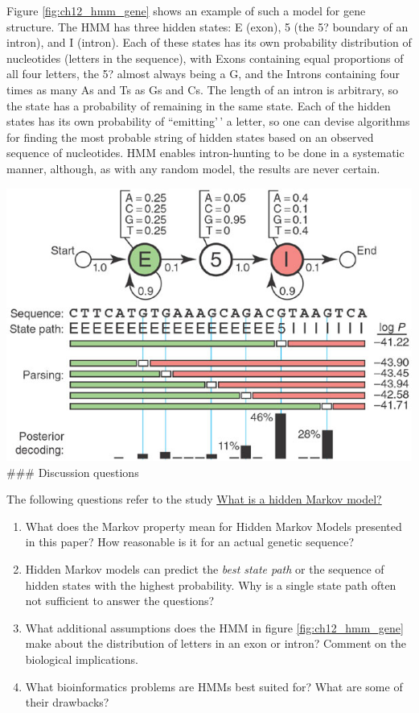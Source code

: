 \documentclass[
  letterpaper,
  DIV=11,
  numbers=noendperiod]{scrreprt}
\begin{document}
Figure \ref{fig:ch12_hmm_gene} shows an example of such a model for gene
structure. The HMM has three hidden states: E (exon), 5 (the 5? boundary
of an intron), and I (intron). Each of these states has its own
probability distribution of nucleotides (letters in the sequence), with
Exons containing equal proportions of all four letters, the 5? almost
always being a G, and the Introns containing four times as many As and
Ts as Gs and Cs. The length of an intron is arbitrary, so the state has
a probability of remaining in the same state. Each of the hidden states
has its own probability of ``emitting'\,' a letter, so one can devise
algorithms for finding the most probable string of hidden states based
on an observed sequence of nucleotides. HMM enables intron-hunting to be
done in a systematic manner, although, as with any random model, the
results are never certain.

\includegraphics{./ch12/hmm_model.png} \#\#\# Discussion questions

The following questions refer to the study
\href{https://www.nature.com/articles/nbt1004-1315}{What is a hidden
Markov model?}

\begin{enumerate}
\def\labelenumi{\arabic{enumi}.}
\item
  What does the Markov property mean for Hidden Markov Models presented
  in this paper? How reasonable is it for an actual genetic sequence?
\item
  Hidden Markov models can predict the \emph{best state path} or the
  sequence of hidden states with the highest probability. Why is a
  single state path often not sufficient to answer the questions?
\item
  What additional assumptions does the HMM in figure
  \ref{fig:ch12_hmm_gene} make about the distribution of letters in an
  exon or intron? Comment on the biological implications.
\item
  What bioinformatics problems are HMMs best suited for? What are some
  of their drawbacks?
\end{enumerate}
\end{document}
